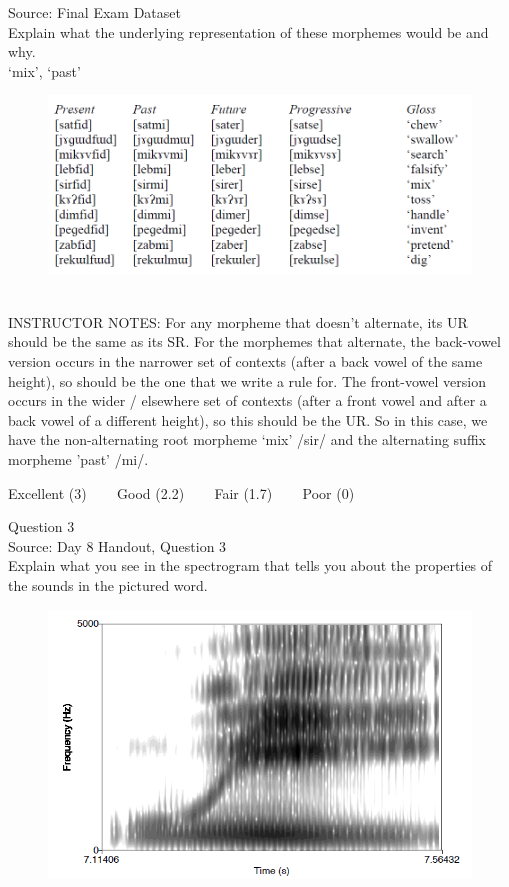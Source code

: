 \documentclass[12pt]{article}
\begin{document}
Source: Final Exam Dataset\\

Explain what the underlying representation of these morphemes would be and why.\\

`mix', `past'

\begin{figure}[H]
\includegraphics{../images/final_dataset.png}
\end{figure}

~\\
INSTRUCTOR NOTES: For any morpheme that doesn’t alternate, its UR should be the same as its SR.  For the morphemes that alternate, the back-vowel version occurs in the narrower set of contexts (after a back vowel of the same height), so should be the one that we write a rule for. The front-vowel version occurs in the wider / elsewhere set of contexts (after a front vowel and after a back vowel of a different height), so this should be the UR. So in this case, we have the non-alternating root morpheme ‘mix’ /sir/ and the alternating suffix morpheme 'past' /mi/.


\vfill
Excellent (3) ~~~ Good (2.2) ~~~ Fair (1.7) ~~~ Poor (0)
\newpage

{\large Question 3}\\

Source: Day 8 Handout, Question 3\\

Explain what you see in the spectrogram that tells you about the properties of the sounds in the pictured word.\\

\begin{figure}[H]
\includegraphics{../images/spectrogram_we.png}
\end{figure}
\end{document}
